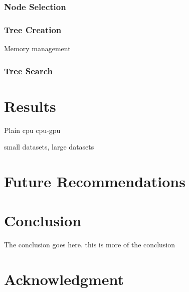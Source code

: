 \documentclass[10pt, conference, compsocconf]{IEEEtran}
\begin{document}
\subsubsection{Node Selection}

\subsubsection{Tree Creation}
Memory management

\subsubsection{Tree Search}

\section{Results}
Plain cpu
cpu-gpu

small datasets, large datasets

\section{Future Recommendations}

\section{Conclusion} 
The conclusion goes here. this is more of the conclusion 
 
 
\section*{Acknowledgment} 

  
  


% 
% 
 
\end{document}
